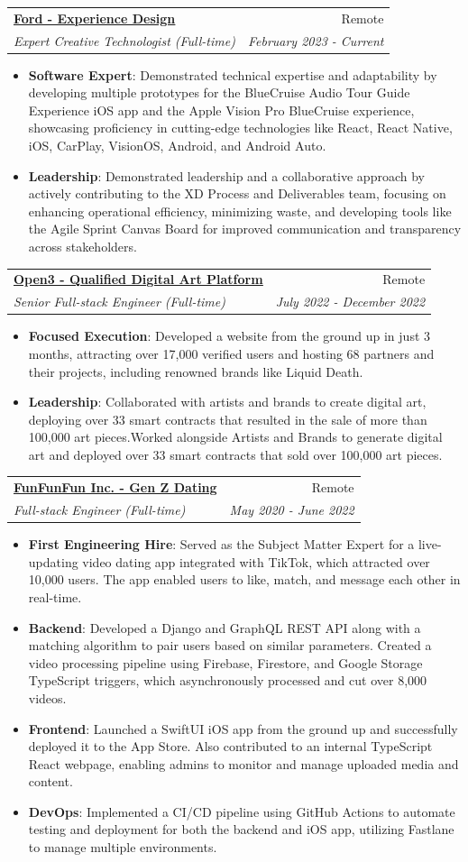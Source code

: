 \documentclass[a4paper,20pt]{article}
\makeatletter
\newcommand{\resumeItem}[2]{
  \item\small{
    \textbf{#1}{: #2 \vspace{-2pt}}
  }
}
\newcommand{\resumeSubheading}[4]{
  \vspace{-1pt}\item
    \begin{tabular*}{0.97\textwidth}{l@{\extracolsep{\fill}}r}
      \textbf{#1} & #2 \\
      \textit{#3} & \textit{#4} \\
    \end{tabular*}\vspace{-5pt}
}
\newcommand{\resumeItemListStart}{\begin{itemize}}
\newcommand{\resumeItemListEnd}{\end{itemize}\vspace{-5pt}}
\makeatother
\begin{document}
  \resumeSubheading{\underline{\href{http://ford.com}{Ford - Experience Design}}}{Remote}
    {Expert Creative Technologist (Full-time)}{February 2023 - Current}
    \resumeItemListStart
          \resumeItem{Software Expert}
          {Demonstrated technical expertise and adaptability by developing multiple prototypes for the BlueCruise Audio Tour Guide Experience iOS app and the Apple Vision Pro BlueCruise experience, showcasing proficiency in cutting-edge technologies like React, React Native, iOS, CarPlay, VisionOS, Android, and Android Auto.}
          \resumeItem{Leadership}
          {Demonstrated leadership and a collaborative approach by actively contributing to the XD Process and Deliverables team, focusing on enhancing operational efficiency, minimizing waste, and developing tools like the Agile Sprint Canvas Board for improved communication and transparency across stakeholders.}
          \resumeItemListEnd

  \resumeSubheading{\underline{\href{http://open3.com}{Open3 - Qualified Digital Art Platform}}}{Remote}
    {Senior Full-stack Engineer (Full-time)}{July 2022 - December 2022}
    \resumeItemListStart
          \resumeItem{Focused Execution}
          {Developed a website from the ground up in just 3 months, attracting over 17,000 verified users and hosting 68 partners and their projects, including renowned brands like Liquid Death.}
          \resumeItem{Leadership}
          {Collaborated with artists and brands to create digital art, deploying over 33 smart contracts that resulted in the sale of more than 100,000 art pieces.Worked alongside Artists and Brands to generate digital art and deployed over 33 smart contracts that sold over 100,000 art pieces.}
          \resumeItemListEnd

          \resumeSubheading{\underline{\href{http://funfunfun.app}{FunFunFun Inc. - Gen Z Dating}}}{Remote}
    {Full-stack Engineer (Full-time)}{May 2020 - June 2022}
    \resumeItemListStart
        \resumeItem{First Engineering Hire}
          {Served as the Subject Matter Expert for a live-updating video dating app integrated with TikTok, which attracted over 10,000 users. The app enabled users to like, match, and message each other in real-time.}
          \resumeItem{Backend}
          {Developed a Django and GraphQL REST API along with a matching algorithm to pair users based on similar parameters. Created a video processing pipeline using Firebase, Firestore, and Google Storage TypeScript triggers, which asynchronously processed and cut over 8,000 videos.}
          \resumeItem{Frontend}
          {Launched a SwiftUI iOS app from the ground up and successfully deployed it to the App Store. Also contributed to an internal TypeScript React webpage, enabling admins to monitor and manage uploaded media and content.}
          \resumeItem{DevOps}
          {Implemented a CI/CD pipeline using GitHub Actions to automate testing and deployment for both the backend and iOS app, utilizing Fastlane to manage multiple environments.}
      \resumeItemListEnd
\end{document}
